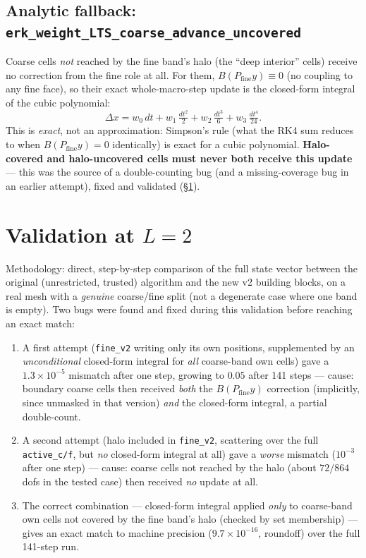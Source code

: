 \documentclass[11pt]{article}
\newcommand{\code}[1]{\texttt{#1}}
\begin{document}
\subsection{Analytic fallback: \code{erk\_weight\_LTS\_coarse\_advance\_uncovered}}

Coarse cells \emph{not} reached by the fine band's halo (the ``deep
interior'' cells) receive no correction from the fine role at all. For
them, $B(P_{\text{fine}} y) \equiv 0$ (no coupling to any fine face), so
their exact whole-macro-step update is the closed-form integral of the
cubic polynomial:
\[
  \Delta x = w_0\, dt + w_1\, \tfrac{dt^2}{2} + w_2\, \tfrac{dt^3}{6}
  + w_3\, \tfrac{dt^4}{24}.
\]
This is \emph{exact}, not an approximation: Simpson's rule (what the RK4
sum reduces to when $B(P_{\text{fine}} y)=0$ identically) is exact for a
cubic polynomial. \textbf{Halo-covered and halo-uncovered cells must
never both receive this update} --- this was the source of a
double-counting bug (and a missing-coverage bug in an earlier attempt),
fixed and validated (\S\ref{sec:validation}).

\section{Validation at $L=2$}
\label{sec:validation}

Methodology: direct, step-by-step comparison of the full state vector
between the original (unrestricted, trusted) algorithm and the new v2
building blocks, on a real mesh with a \emph{genuine} coarse/fine split
(not a degenerate case where one band is empty). Two bugs were found and
fixed during this validation before reaching an exact match:

\begin{enumerate}
  \item A first attempt (\code{fine\_v2} writing only its own positions,
  supplemented by an \emph{unconditional} closed-form integral for
  \emph{all} coarse-band own cells) gave a $1.3\times 10^{-5}$ mismatch
  after one step, growing to $0.05$ after 141 steps --- cause: boundary
  coarse cells then received \emph{both} the $B(P_{\text{fine}} y)$
  correction (implicitly, since unmasked in that version) \emph{and} the
  closed-form integral, a partial double-count.
  \item A second attempt (halo included in \code{fine\_v2}, scattering
  over the full \code{active\_c/f}, but \emph{no} closed-form integral at
  all) gave a \emph{worse} mismatch ($10^{-3}$ after one step) --- cause:
  coarse cells not reached by the halo (about $72/864$ dofs in the tested
  case) then received \emph{no} update at all.
  \item The correct combination --- closed-form integral applied
  \emph{only} to coarse-band own cells not covered by the fine band's
  halo (checked by set membership) --- gives an exact match to machine
  precision ($9.7\times 10^{-16}$, roundoff) over the full 141-step run.
\end{enumerate}
\end{document}
